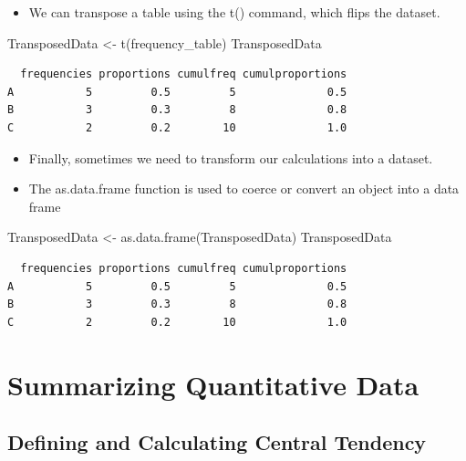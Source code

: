 \documentclass[
  letterpaper,
  DIV=11,
  numbers=noendperiod]{scrreprt}
\newenvironment{Shaded}{\begin{snugshade}}{\end{snugshade}}
\newcommand{\FunctionTok}[1]{\textcolor[rgb]{0.28,0.35,0.67}{#1}}
\newcommand{\NormalTok}[1]{\textcolor[rgb]{0.00,0.23,0.31}{#1}}
\newcommand{\OtherTok}[1]{\textcolor[rgb]{0.00,0.23,0.31}{#1}}
\providecommand{\tightlist}{%
  \setlength{\itemsep}{0pt}\setlength{\parskip}{0pt}}\usepackage{longtable,booktabs,array}
\begin{document}
\begin{itemize}
\tightlist
\item
  We can transpose a table using the t() command, which flips the
  dataset.
\end{itemize}

\begin{Shaded}
\begin{Highlighting}[]
\NormalTok{TransposedData }\OtherTok{\textless{}{-}} \FunctionTok{t}\NormalTok{(frequency\_table)}
\NormalTok{TransposedData}
\end{Highlighting}
\end{Shaded}

\begin{verbatim}
  frequencies proportions cumulfreq cumulproportions
A           5         0.5         5              0.5
B           3         0.3         8              0.8
C           2         0.2        10              1.0
\end{verbatim}

\begin{itemize}
\tightlist
\item
  Finally, sometimes we need to transform our calculations into a
  dataset.
\item
  The as.data.frame function is used to coerce or convert an object into
  a data frame
\end{itemize}

\begin{Shaded}
\begin{Highlighting}[]
\NormalTok{TransposedData }\OtherTok{\textless{}{-}} \FunctionTok{as.data.frame}\NormalTok{(TransposedData)}
\NormalTok{TransposedData}
\end{Highlighting}
\end{Shaded}

\begin{verbatim}
  frequencies proportions cumulfreq cumulproportions
A           5         0.5         5              0.5
B           3         0.3         8              0.8
C           2         0.2        10              1.0
\end{verbatim}


\chapter{Summarizing Quantitative
Data}\label{summarizing-quantitative-data}

\section{Defining and Calculating Central
Tendency}\label{defining-and-calculating-central-tendency}
\end{document}
